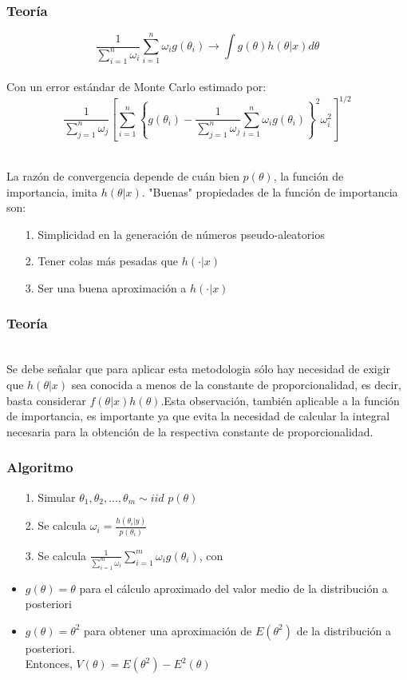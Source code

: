 \documentclass[12pt]{beamer}
\begin{document}
\begin{frame}
\frametitle{Teoría}
$$\frac{1}{\sum\limits_{i=1}^{n}\omega_{i}}\sum\limits_{i=1}^{n}\omega_{i}g(\theta_{i}) \rightarrow \int g(\theta)h(\theta|x)d\theta$$
~\\Con un error estándar de Monte Carlo estimado por:
$$\frac{1}{\sum\limits_{j=1}^{n}\omega_{j}}\left[\sum\limits_{i=1}^{n}\left\lbrace g(\theta_{i})-\frac{1}{\sum\limits_{j=1}^{n}\omega_{j}}\sum\limits_{i=1}^{n}\omega_{i}g(\theta_{i})\right\rbrace^{2}\omega_{i}^2\right]^{1/2} $$
\end{frame}

\begin{frame}
~\\La razón de convergencia depende de cuán bien $p(\theta)$, la función de importancia, imita $h(\theta|x)$. "Buenas" propiedades de la función de importancia son: 
\begin{itemize}
\item[1.]Simplicidad en la generación de números pseudo-aleatorios
\item[2.]Tener colas más pesadas que $h(\cdot|x)$
\item[3.]Ser una buena aproximación a $h(\cdot|x)$
\end{itemize}
\end{frame}

\begin{frame}
\frametitle{Teoría}
~\\ Se debe señalar que para aplicar esta metodologia sólo hay necesidad de exigir que $h(\theta|x)$ sea conocida a menos de la constante de proporcionalidad, es decir, basta considerar $f(\theta|x)h(\theta)$.Esta observación, también aplicable a la función de importancia, es importante ya que evita la necesidad de calcular la integral necesaria para la obtención de la respectiva constante de proporcionalidad.
\end{frame}

\begin{frame}
\frametitle{Algoritmo}
\begin{itemize}
\item[1.]Simular $\theta_{1},\theta_{2},...,\theta_{m}\sim iid$  $p(\theta)$
\item[2.]Se calcula $\omega_{i}=\frac{h(\theta_{i}|y)}{p(\theta_{i})}$
\item[3.]Se calcula $\frac{1}{\sum_{i=1}^{m}\omega_{i}}\sum_{i=1}^{m}\omega_{i}g(\theta_{i})$, con
\item $g(\theta)=\theta$ para el cálculo aproximado del valor medio de la distribución a posteriori
\item $g(\theta)=\theta^{2}$ para obtener una aproximación de $E(\theta^2)$ de la distribución a posteriori.
~\\Entonces, $V(\theta)=E(\theta^2)-E^2(\theta)$
\end{itemize}
\end{frame}
\end{document}
